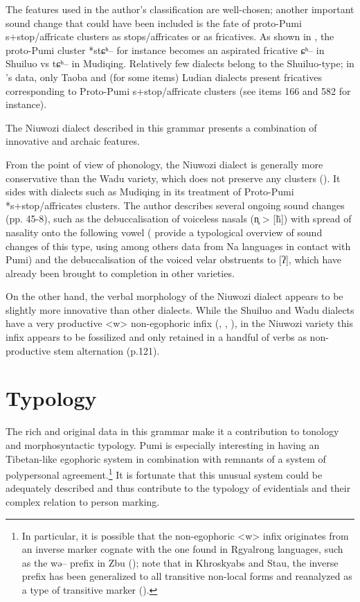 \documentclass[oldfontcommands,oneside,a4paper,11pt]{article}
\newcommand{\ipa}[1]{{\phon #1}} %
\newcommand{\ipapl}[1]{{\phondroit #1}}
\begin{document}
The features used in the author's classification are well-chosen; another important sound change that could have been included is the fate of proto-Pumi s+stop/affricate clusters as stops/affricates or as fricatives. As shown in \citet{jacques11lingua}, the proto-Pumi cluster *\ipa{stɕʰ--} for instance becomes an aspirated fricative \ipa{ɕʰ--} in Shuiluo vs \ipa{tɕʰ--} in Mudiqing. Relatively few dialects belong to the Shuiluo-type; in \citet{lusz01pumi}'s data, only Taoba and (for some items) Ludian dialects present fricatives corresponding to Proto-Pumi s+stop/affricate clusters (see items 166 and 582 for instance).

The Niuwozi dialect described in this grammar presents a combination of innovative and archaic features. 
 
From the point of view of phonology, the Niuwozi dialect is generally more conservative than the Wadu variety, which does not preserve any clusters (\citealt[20-1]{daudey14grammar}). It sides with dialects such as Mudiqing in its treatment of Proto-Pumi *s+stop/affricates clusters. The author describes several ongoing sound changes (pp. 45-8), such as the debuccalisation of voiceless nasals (\ipapl{n̥} > [\ipapl{h̃}]) with spread of nasality onto the following vowel (\citealt{michaud-jacques12nasalite} provide a typological overview of sound changes of this type, using among others data from Na languages in contact with Pumi) and the debuccalisation of the voiced velar obstruents to [\ipapl{ʔ}], which have already been brought to completion in other varieties.
 
On the other hand, the verbal morphology of the Niuwozi dialect appears to be slightly more innovative than other dialects. While the Shuiluo and  Wadu dialects have a very productive <w> non-egophoric infix (\citealt{jacques11pumi.tone}, \citealt[338]{daudey14grammar}, \citealt[80]{daudey14volition}), in the Niuwozi variety this infix appears to be fossilized and only retained in a handful of verbs as non-productive stem alternation (p.121). 
 
 

\section{Typology}
The rich and original data in this grammar make it a contribution to tonology and  morphosyntactic typology. Pumi is especially interesting in having an Tibetan-like egophoric system in combination with remnants of a system of polypersonal agreement.\footnote{In particular, it is possible that the non-egophoric <w> infix originates from an inverse marker cognate with the one found in Rgyalrong languages, such as the \ipa{wə--} prefix in Zbu (\citealt{gongxun14agreement}); note that in Khroskyabs and Stau, the inverse prefix has been generalized to all transitive non-local forms and reanalyzed as a type of transitive marker (\citealt{lai15person, jacques14rtau}).} It is fortunate that this unusual system could be adequately described and thus contribute to the typology of evidentials and their complex relation to person marking.
\end{document}
